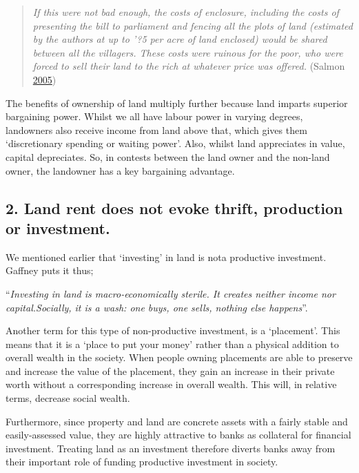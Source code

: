 \documentclass[]{tufte-handout}
\begin{document}
\begin{quote}
\emph{If this were not bad enough, the costs of enclosure, including the
costs of presenting the bill to parliament and fencing all the plots of
land (estimated by the authors at up to '?5 per acre of land enclosed)
would be shared between all the villagers. These costs were ruinous for
the poor, who were forced to sell their land to the rich at whatever
price was offered.} (Salmon \protect\hyperlink{ref-Salmon2005}{2005})
\end{quote}

The benefits of ownership of land multiply further because land imparts
superior bargaining power. Whilst we all have labour power in varying
degrees, landowners also receive income from land above that, which
gives them `discretionary spending or waiting power'. Also, whilst land
appreciates in value, capital depreciates. So, in contests between the
land owner and the non-land owner, the landowner has a key bargaining
advantage.

\hypertarget{land-rent-does-not-evoke-thrift-production-or-investment.}{%
\subsection{2. Land rent does not evoke thrift, production or
investment.}\label{land-rent-does-not-evoke-thrift-production-or-investment.}}

We mentioned earlier that `investing' in land is nota productive
investment. Gaffney puts it thus;

``\emph{Investing in land is macro-economically sterile. It creates
neither income nor capital.Socially, it is a wash: one buys, one sells,
nothing else happens}''.

Another term for this type of non-productive investment, is a
`placement'. This means that it is a `place to put your money' rather
than a physical addition to overall wealth in the society. When people
owning placements are able to preserve and increase the value of the
placement, they gain an increase in their private worth without a
corresponding increase in overall wealth. This will, in relative terms,
decrease social wealth.

Furthermore, since property and land are concrete assets with a fairly
stable and easily-assessed value, they are highly attractive to banks as
collateral for financial investment. Treating land as an investment
therefore diverts banks away from their important role of funding
productive investment in society.
\end{document}
